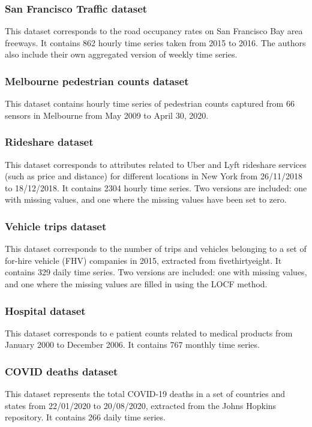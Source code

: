\documentclass{article}
\begin{document}
\subsubsection{San Francisco Traffic dataset}
This dataset corresponds to the road occupancy rates on San Francisco Bay area freeways. It contains 862 hourly time series taken from 2015 to 2016. The authors also include their own aggregated version of weekly time series.

\subsubsection{Melbourne pedestrian counts dataset}
This dataset contains hourly time series of pedestrian counts captured from 66 sensors in Melbourne from May 2009 to April 30, 2020.

\subsubsection{Rideshare dataset}
This dataset corresponds to attributes related to Uber and Lyft rideshare services (such as price and distance) for different locations in New York from 26/11/2018 to 18/12/2018. It contains 2304 hourly time series. Two versions are included: one with missing values, and one where the missing values have been set to zero.

\subsubsection{Vehicle trips dataset}
This dataset corresponds to the number of trips and vehicles belonging to a set of for-hire vehicle (FHV) companies in 2015, extracted from fivethirtyeight. It contains 329 daily time series. Two versions are included: one with missing values, and one where the missing values are filled in using the LOCF method.

\subsubsection{Hospital dataset}
This dataset corresponds to e patient counts related to medical products from January 2000 to December 2006. It contains 767 monthly time series.

\subsubsection{COVID deaths dataset}
This dataset represents the total COVID-19 deaths in a set of countries and states from 22/01/2020 to 20/08/2020, extracted from the Johns Hopkins repository. It contains 266 daily time series.
\end{document}
